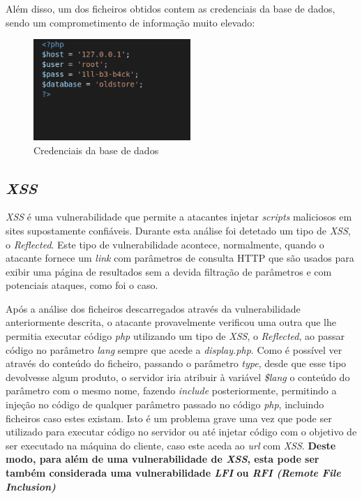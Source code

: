 \documentclass[10pt,english]{article}
\begin{document}
\clearpage

\par Além disso, um dos ficheiros obtidos contem as credenciais da base de dados, sendo um comprometimento de informação muito elevado: 

\begin{figure}[h]
    \centering
    \includegraphics[width=225]{images/configphp.png}
    \caption{Credenciais da base de dados}
\end{figure}

\clearpage


\subsection{\textit{XSS}}

\par \textit{XSS} é uma vulnerabilidade que permite a atacantes injetar \textit{scripts} maliciosos em sites supostamente confiáveis. Durante esta análise foi detetado um tipo de \textit{XSS}, o \textit{Reflected}. Este tipo de vulnerabilidade acontece, normalmente, quando o atacante fornece um \textit{link} com parâmetros de consulta HTTP que são usados para exibir uma página de resultados sem a devida filtração de parâmetros e com potenciais ataques, como foi o caso.

\par Após a análise dos ficheiros descarregados através da vulnerabilidade anteriormente descrita, o atacante provavelmente verificou uma outra que lhe permitia executar código \textit{php} utilizando um tipo de \textit{XSS}, o \textit{Reflected}, ao passar código no parâmetro \textit{lang} sempre que acede a \textit{display.php}. Como é possível ver através do conteúdo do ficheiro, passando o parâmetro \textit{type}, desde que esse tipo devolvesse algum produto, o servidor iria atribuir à variável \textit{\$lang} o conteúdo do parâmetro com o mesmo nome, fazendo \textit{include} posteriormente, permitindo a injeção no código de qualquer parâmetro passado no código \textit{php}, incluindo ficheiros caso estes existam. Isto é um problema grave uma vez que pode ser utilizado para executar código no servidor ou até injetar código com o objetivo de ser executado na máquina do cliente, caso este aceda ao \textit{url} com \textit{XSS}. \textbf{Deste modo, para além de uma vulnerabilidade de \textit{XSS}, esta pode ser também considerada uma vulnerabilidade \textit{LFI} ou \textit{RFI (Remote File Inclusion)}}
\end{document}
